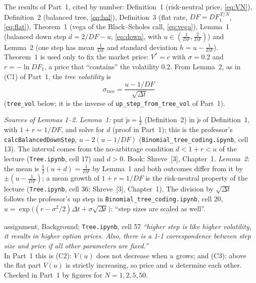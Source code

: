 \documentclass[11pt,a4paper]{article}
\newcommand{\subhead}[1]{\par\medskip\noindent{\large\bfseries #1}\par\smallskip\noindent\ignorespaces}
\begin{document}

\subhead{Results used.}
The results of Part~1, cited by number: Definition~1 (risk-neutral price, \eqref{eq:VN}), Definition~2 (balanced tree, \eqref{eq:bal}), Definition~3 (flat rate, $DF=DF_1^{\,T/N}$, \eqref{eq:flat}), Theorem~1 (vega of the Black--Scholes call, \eqref{eq:vega}), Lemma~1 (balanced down step $d=2/DF-u$, \eqref{eq:down}, with $u\in(\frac1{DF},\frac2{DF})$) and Lemma~2 (one step has mean $\frac1{DF}$ and standard deviation $h=u-\frac1{DF}$). Theorem~1 is used only to fix the market price: $V^*=c$ with $\sigma=0.2$ and $r=-\ln DF_1$, a price that ``contains'' the volatility $0.2$. From Lemma~2, as in (C1) of Part~1, the \emph{tree volatility} is
\begin{equation}\label{eq:vol}
\sigma_{\text{tree}}=\frac{u-1/DF}{\sqrt{\Delta t}}
\end{equation}
(\texttt{tree\_vol} below; it is the inverse of \texttt{up\_step\_from\_tree\_vol} of Part~1).

\noindent\emph{Sources of Lemmas 1--2.} \emph{Lemma~1:} put $\tilde p=\frac12$ (Definition~2) in $\tilde p$ of Definition~1, with $1+r=1/DF$, and solve for $d$ (proof in Part~1); this is the professor's \texttt{calcBalancedDownStep}, $u-2(u-1/DF)$ (\texttt{Binomial\_tree\_coding.ipynb}, cell 13). The interval comes from the no-arbitrage condition $d<1+r<u$ of the lecture (\texttt{Tree.ipynb}, cell 17) and $d>0$. Book: Shreve~[3], Chapter~1. \emph{Lemma~2:} the mean is $\frac12(u+d)=\frac1{DF}$ by Lemma~1 and both outcomes differ from it by $\pm(u-\frac1{DF})$; a mean growth of $1+r=1/DF$ is the risk-neutral property of the lecture (\texttt{Tree.ipynb}, cell 36; Shreve~[3], Chapter~1). The division by $\sqrt{\Delta t}$ follows the professor's up step in \texttt{Binomial\_tree\_coding.ipynb}, cell 20, $u=\exp\bigl((r-\sigma^2/2)\Delta t+\sigma\sqrt{\Delta t}\bigr)$: ``step sizes are scaled as well''.

\begin{stmbox}{assignment, Background; \texttt{Tree.ipynb}, cell 57}
\emph{``higher step is like higher volatility, it results in higher option prices. Also, there is a 1-1 correspondence between step size and price if all other parameters are fixed.''}\\
In Part~1 this is (C2): $V(u)$ does not decrease when $u$ grows; and (C3): above the flat part $V(u)$ is strictly increasing, so price and $u$ determine each other. Checked in Part~1 by figures for $N=1,2,5,50$.
\end{stmbox}
\end{document}
